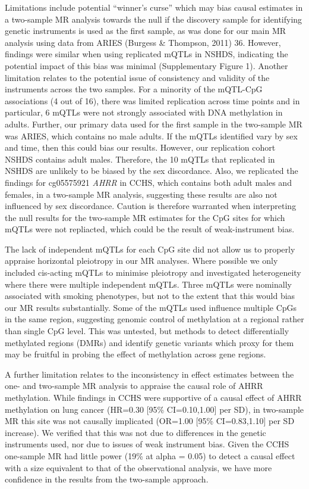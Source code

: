 \documentclass[11pt,twoside]{bristolthesis}
\begin{document}
Limitations include potential ``winner's curse'' which may bias causal estimates in a two-sample MR analysis towards the null if the discovery sample for identifying genetic instruments is used as the first sample, as was done for our main MR analysis using data from ARIES (Burgess \& Thompson, 2011) 36. However, findings were similar when using replicated mQTLs in NSHDS, indicating the potential impact of this bias was minimal (Supplementary Figure 1). Another limitation relates to the potential issue of consistency and validity of the instruments across the two samples. For a minority of the mQTL-CpG associations (4 out of 16), there was limited replication across time points and in particular, 6 mQTLs were not strongly associated with DNA methylation in adults. Further, our primary data used for the first sample in the two-sample MR was ARIES, which contains no male adults. If the mQTLs identified vary by sex and time, then this could bias our results. However, our replication cohort NSHDS contains adult males. Therefore, the 10 mQTLs that replicated in NSHDS are unlikely to be biased by the sex discordance. Also, we replicated the findings for cg05575921 \emph{AHRR} in CCHS, which contains both adult males and females, in a two-sample MR analysis, suggesting these results are also not influenced by sex discordance. Caution is therefore warranted when interpreting the null results for the two-sample MR estimates for the CpG sites for which mQTLs were not repliacted, which could be the result of weak-instrument bias.

The lack of independent mQTLs for each CpG site did not allow us to properly appraise horizontal pleiotropy in our MR analyses. Where possible we only included cis-acting mQTLs to minimise pleiotropy and investigated heterogeneity where there were multiple independent mQTLs. Three mQTLs were nominally associated with smoking phenotypes, but not to the extent that this would bias our MR results substantially. Some of the mQTLs used influence multiple CpGs in the same region, suggesting genomic control of methylation at a regional rather than single CpG level. This was untested, but methods to detect differentially methylated regions (DMRs) and identify genetic variants which proxy for them may be fruitful in probing the effect of methylation across gene regions.

A further limitation relates to the inconsistency in effect estimates between the one- and two-sample MR analysis to appraise the causal role of AHRR methylation. While findings in CCHS were supportive of a causal effect of AHRR methylation on lung cancer (HR=0.30 {[}95\% CI=0.10,1.00{]} per SD), in two-sample MR this site was not causally implicated (OR=1.00 {[}95\% CI=0.83,1.10{]} per SD increase). We verified that this was not due to differences in the genetic instruments used, nor due to issues of weak instrument bias. Given the CCHS one-sample MR had little power (19\% at alpha = 0.05) to detect a causal effect with a size equivalent to that of the observational analysis, we have more confidence in the results from the two-sample approach.
\end{document}
